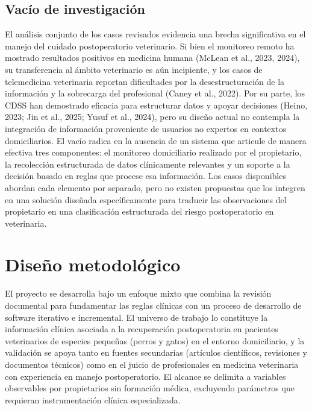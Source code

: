 \documentclass[stu, spanish]{apa7}
\begin{document}
\subsection{Vac\'{i}o de investigaci\'{o}n}
El an\'{a}lisis conjunto de los casos revisados evidencia una brecha significativa en el manejo del cuidado postoperatorio veterinario. Si bien el monitoreo remoto ha mostrado resultados positivos en medicina humana (McLean et al., 2023, 2024), su transferencia al \'{a}mbito veterinario es a\'{u}n incipiente, y los casos de telemedicina veterinaria reportan dificultades por la desestructuraci\'{o}n de la informaci\'{o}n y la sobrecarga del profesional (Caney et al., 2022). Por su parte, los CDSS han demostrado eficacia para estructurar datos y apoyar decisiones (Heino, 2023; Jin et al., 2025; Yusuf et al., 2024), pero su dise\~{n}o actual no contempla la integraci\'{o}n de informaci\'{o}n proveniente de usuarios no expertos en contextos domiciliarios. El vac\'{i}o radica en la ausencia de un sistema que articule de manera efectiva tres componentes: el monitoreo domiciliario realizado por el propietario, la recolecci\'{o}n estructurada de datos cl\'{i}nicamente relevantes y un soporte a la decisi\'{o}n basado en reglas que procese esa informaci\'{o}n. Los casos disponibles abordan cada elemento por separado, pero no existen propuestas que los integren en una soluci\'{o}n dise\~{n}ada espec\'{i}ficamente para traducir las observaciones del propietario en una clasificaci\'{o}n estructurada del riesgo postoperatorio en veterinaria.

\section{Dise\~{n}o metodol\'{o}gico}

El proyecto se desarrolla bajo un enfoque mixto que combina la revisi\'{o}n documental para fundamentar las reglas cl\'{i}nicas con un proceso de desarrollo de software iterativo e incremental. El universo de trabajo lo constituye la informaci\'{o}n cl\'{i}nica asociada a la recuperaci\'{o}n postoperatoria en pacientes veterinarios de especies peque\~{n}as (perros y gatos) en el entorno domiciliario, y la validaci\'{o}n se apoya tanto en fuentes secundarias (art\'{i}culos cient\'{i}ficos, revisiones y documentos t\'{e}cnicos) como en el juicio de profesionales en medicina veterinaria con experiencia en manejo postoperatorio. El alcance se delimita a variables observables por propietarios sin formaci\'{o}n m\'{e}dica, excluyendo par\'{a}metros que requieran instrumentaci\'{o}n cl\'{i}nica especializada.
\end{document}
